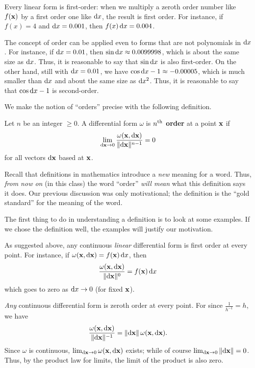 \documentclass[12pt]{amsart}
\begin{document}
Every linear form is first-order: when we multiply a zeroth order number like $f(\mathbf{x})$ by a first order one like $\mathrm{d} x$, the result is first order.
For instance, if $f(x) = 4$ and $\mathrm{d} x = 0.001$, then $f(x)\,\mathrm{d} x = 0.004$.

The concept of order can be applied even to forms that are not polynomials in $\mathrm{d} x$.
For instance, if $\mathrm{d} x=0.01$, then $\sin \mathrm{d} x \approx 0.0099998$, which is about the same size as $\mathrm{d} x$.
Thus, it is reasonable to say that $\sin\mathrm{d} x$ is also first-order.
On the other hand, still with $\mathrm{d} x=0.01$, we have $\cos \mathrm{d} x - 1 \approx -0.00005$, which is much smaller than $\mathrm{d} x$ and about the same size as $\mathrm{d} x^2$.
Thus, it is reasonable to say that $\cos \mathrm{d} x - 1$ is second-order.

We make the notion of ``orders'' precise with the following definition.

\begin{defn}
  Let $n$ be an integer $\ge 0$.
  A differential form $\omega$ is \textbf{$n^{\mathrm{th}}$ order} at a point $\mathbf{x}$ if
  \[ \lim_{\mathrm{d} \mathbf{x}\to 0} \frac{\omega(\mathbf{x},\mathrm{d} \mathbf{x})}{\Vert \mathrm{d} \mathbf{x} \Vert^{n-1}} = 0 \]
  for all vectors $\mathrm{d} \mathbf{x}$ based at $\mathbf{x}$.
\end{defn}

Recall that definitions in mathematics introduce a \emph{new} meaning for a word.
Thus, \emph{from now on} (in this class) the word ``order'' \emph{will mean} what this definition says it does.
Our previous discussion was only motivational; the definition is the ``gold standard'' for the meaning of the word.

The first thing to do in understanding a definition is to look at some examples.
If we chose the definition well, the examples will justify our motivation.

\begin{eg}
  As suggested above, any continuous \emph{linear} differential form is first order at every point.
  For instance, if $\omega(\mathbf{x},\mathrm{d}\mathbf{x}) = f(\mathbf{x}) \, \mathrm{d} x$, then
  \[ \frac{\omega(\mathbf{x},\mathrm{d} \mathbf{x})}{\Vert \mathrm{d} \mathbf{x} \Vert^0} = f(\mathbf{x}) \, \mathrm{d} x\]
  which goes to zero as $\mathrm{d} x\to 0$ (for fixed $\mathbf{x}$).
\end{eg}

\begin{eg}
  \emph{Any} continuous differential form is zeroth order at every point.
  For since $\frac{1}{h^{-1}} = h$, we have
  \[\frac{\omega(\mathbf{x},\mathrm{d} \mathbf{x})}{\Vert \mathrm{d} \mathbf{x} \Vert^{-1}} = \Vert \mathrm{d} \mathbf{x} \Vert \, \omega(\mathbf{x},\mathrm{d} \mathbf{x}).\]
  Since $\omega$ is continuous, $\lim_{\mathrm{d} \mathbf{x}\to 0} \omega(\mathbf{x},\mathrm{d} \mathbf{x})$ exists; while of course $\lim_{\mathrm{d} \mathbf{x}\to 0} \Vert \mathrm{d} \mathbf{x} \Vert = 0$.
  Thus, by the product law for limits, the limit of the product is also zero.
\end{eg}
\end{document}
